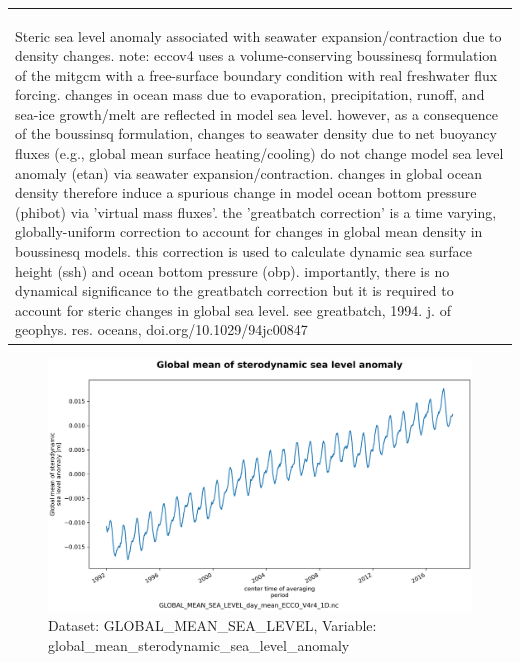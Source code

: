\begin{longtable}{|m{}|m{}|m{}|m{}|}
{{{{{\hspace*{0.5cm}global\_mean\_sterodynamic\_sea\_level\_anomaly: valid\_min = -0.017658796143049296\\
}}}}} \\ \hline
\rowcolor{lightgray} \multicolumn{4}{|c|}{\textbf{Comments}} \\ \hline
\multicolumn{4}{|p{1\textwidth}|}{\footnotesize{{Steric sea level anomaly associated with seawater expansion/contraction due to density changes. note: eccov4 uses a volume-conserving boussinesq formulation of the mitgcm with a free-surface boundary condition with real freshwater flux forcing. changes in ocean mass due to evaporation, precipitation, runoff, and sea-ice growth/melt are reflected in model sea level. however, as a consequence of the boussinsq formulation, changes to seawater density due to net buoyancy fluxes (e.g., global mean surface heating/cooling) do not change model sea level anomaly (etan) via seawater expansion/contraction. changes in global ocean density therefore induce a spurious change in model ocean bottom pressure (phibot) via 'virtual mass fluxes'. the 'greatbatch correction' is a time varying, globally-uniform correction to account for changes in global mean density in boussinesq models. this correction is used to calculate dynamic sea surface height (ssh) and ocean bottom pressure (obp). importantly, there is no dynamical significance to the greatbatch correction but it is required to account for steric changes in global sea level. see greatbatch, 1994. j. of geophys. res. oceans, doi.org/10.1029/94jc00847}}} \\ \hline
\end{longtable}

\begin{figure}[H]
\centering
\includegraphics[scale=0.55]{../images/plots/oneD_plots/Global_Mean_Sea_Level/global_mean_sterodynamic_sea_level_anomaly.png}
\caption{Dataset: GLOBAL\_MEAN\_SEA\_LEVEL, Variable: global\_mean\_sterodynamic\_sea\_level\_anomaly}
\label{tab:table-GLOBAL_MEAN_SEA_LEVEL_global_mean_sterodynamic_sea_level_anomaly-Plot}
\end{figure}
\newpage
